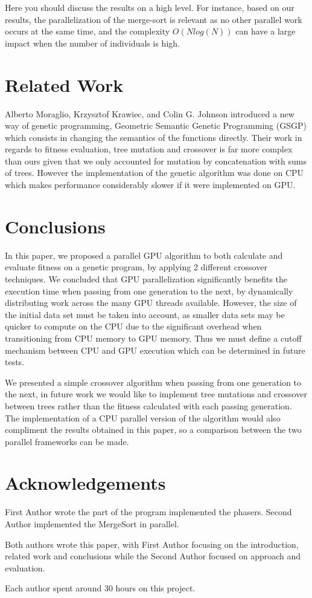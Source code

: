 \documentclass[runningheads]{llncs}
\begin{document}
Here you should discuss the results on a high level. For instance, based on our results, the parallelization of the merge-sort is relevant as no other parallel work occurs at the same time, and the complexity $O(Nlog(N))$ can have a large impact when the number of individuals is high.

\section{Related Work}

Alberto Moraglio, Krzysztof Krawiec, and Colin G. Johnson introduced a new way of genetic programming, Geometric Semantic Genetic Programming (GSGP) which consists in changing the semantics of the functions directly. Their work in regards to fitness evaluation, tree mutation and crossover is far more complex than ours given that we only accounted for mutation by concatenation with sums of trees. However the implementation of the genetic algorithm was done on CPU which makes performance considerably slower if it were implemented on GPU.


\section{Conclusions}

In this paper, we proposed a parallel GPU algorithm to both calculate and evaluate fitness on a genetic program, by applying 2 different crossover techniques. We concluded that GPU parallelization significantly benefits the execution time when passing from one generation to the next, by dynamically distributing work across the many GPU threads available. However, the size of the initial data set must be taken into account, as smaller data sets may be quicker to compute on the CPU due to the significant overhead when transitioning from CPU memory to GPU memory. Thus we must define a cutoff mechanism between CPU and GPU execution which can be determined in future tests.

We presented a simple crossover algorithm when passing from one generation to the next, in future work we would like to implement tree mutations and crossover between trees rather than the fitness calculated with each passing generation. The implementation of a CPU parallel version of the algorithm would also compliment the results obtained in this paper, so a comparison between the two parallel frameworks can be made.

\section*{Acknowledgements}

First Author wrote the part of the program implemented the phasers. Second Author implemented the MergeSort in parallel. 

Both authors wrote this paper, with First Author focusing on the introduction, related work and conclusions while the Second Author focused on approach and evaluation.

Each author spent around 30 hours on this project.



\end{document}
